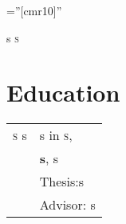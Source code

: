 

\pagestyle{empty}
\font \fb=''[cmr10]''
\par{	\centering
	{
		 \Huge s \textsc{s}
	}\bigskip
\par}
\section{Education}
\begin{tabular}{rl}
\textsc{s} s & s in \textsc{s},\\& \textbf{s}, s\\ & Thesis:s\\& Advisor: s
\end{tabular}

